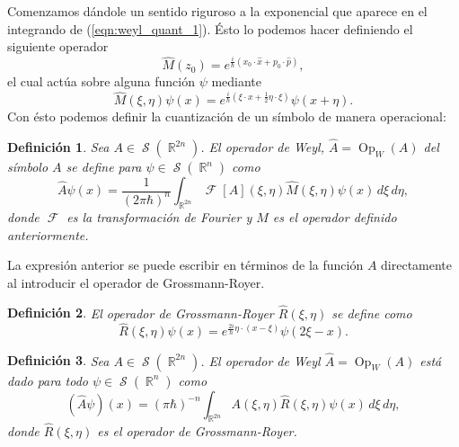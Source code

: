 \documentclass[a4paper]{report}
\DeclareMathOperator{\R}{\mathbb{R}}
\DeclareMathOperator{\Sz}{\mathcal S}
\DeclareMathOperator{\Op}{Op}
\DeclareMathOperator{\F}{\mathcal{F}}
\newtheorem{definition}{Definición}
\begin{document}
  Comenzamos dándole un sentido riguroso a la exponencial
  que aparece en el integrando de (\ref{eqn:weyl_quant_1}).
  Ésto lo podemos hacer definiendo el siguiente operador
  \begin{equation*}
    \hat{M}(z_0)
    = e^{\frac{i}{\hbar} \left( x_0 \cdot \hat{x} + p_0
    \cdot \hat{p} \right) },
  \end{equation*} 
  el cual actúa sobre alguna función $\psi$ mediante
  \begin{equation}
    \hat{M}(\xi,\eta)\psi(x)
    = e^{\frac{i}{\hbar} \left( \xi \cdot x + \frac{1}{2}
    \eta \cdot \xi \right)} \psi(x + \eta).
  \end{equation} 
  Con ésto podemos definir la cuantización de un símbolo de
  manera operacional:
  \begin{definition}
    Sea $A \in \Sz(\R^{2n})$. El operador de Weyl, $\hat{A}
    = \Op_W(A)$ del símbolo $A$ se define para $\psi \in
    \Sz(\R^{n})$ como
    \begin{equation}
      \label{eqn:weyl_quant_2}
      \hat{A}\psi(x)
      = \frac{1}{(2\pi\hbar)^{n}}
      \int_{\R^{2n}} \F[A](\xi,\eta) \hat{M}(\xi,\eta)
      \psi(x) \, d\xi \, d\eta,
    \end{equation}
    donde $\F$ es la transformación de Fourier y $\hat{M}$ es
    el operador definido anteriormente.
  \end{definition}
  La expresión anterior se puede escribir en términos de la
  función $A$ directamente al introducir el operador de
  Grossmann-Royer.
  \begin{definition}
    El operador de Grossmann-Royer $\hat{R}(\xi,\eta)$ se
    define como
    \[
      \hat{R}(\xi,\eta)\psi(x)
      = e^{\frac{2i}{\hbar} \eta \cdot (x - \xi)} \psi(2\xi
      - x).
    \] 
  \end{definition}
  \begin{definition}
    Sea $A \in \Sz(\R^{2n})$. El operador de Weyl $\hat{A} =
    \Op_W(A)$ está dado para todo $\psi \in \Sz(\R^{n})$ 
    como
    \begin{equation}
      \left( \hat{A}\psi \right)(x)
      = (\pi\hbar)^{-n} \int_{\R^{2n}}
      A(\xi,\eta)\hat{R}(\xi,\eta)\psi(x) \, d\xi \, d\eta,
    \end{equation}
    donde $\hat{R}(\xi,\eta)$ es el operador de
    Grossmann-Royer.
  \end{definition}
  
\end{document}
